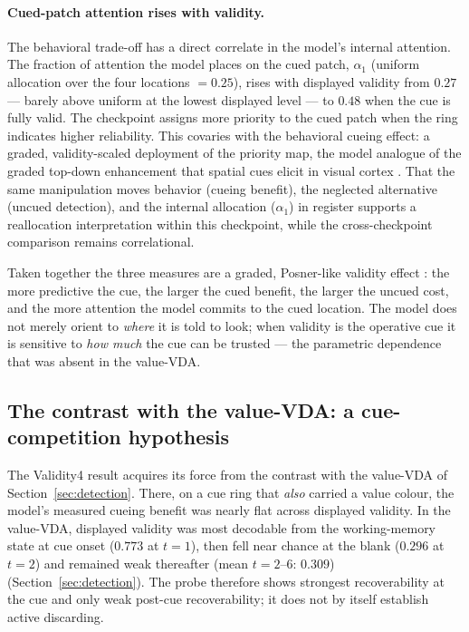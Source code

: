 \paragraph{Cued-patch attention rises with validity.} The behavioral trade-off has
a direct correlate in the model's internal attention. The fraction of attention the
model places on the cued patch, $\alpha_1$ (uniform allocation over the four
locations $= 0.25$), rises with displayed validity from $0.27$ --- barely above uniform at
the lowest displayed level --- to $0.48$ when the cue is fully valid. The checkpoint assigns more priority to the cued patch when the ring indicates higher
reliability. This covaries with the behavioral cueing effect: a
graded, validity-scaled deployment of the priority map, the model analogue of the
graded top-down enhancement that spatial cues elicit in visual cortex
\cite{mcadams_maunsell1999_v4_tuning, reynolds_heeger2009_normalization,
carrasco2011_visual_attention_25y}. That the same manipulation moves behavior
(cueing benefit), the neglected alternative (uncued detection), and the internal
allocation ($\alpha_1$) in register supports a reallocation interpretation within
this checkpoint, while the cross-checkpoint comparison remains correlational.

Taken together the three measures are a graded, Posner-like validity effect
\cite{posner1980_orienting}: the more predictive the cue, the larger the cued
benefit, the larger the uncued cost, and the more attention the model commits to the
cued location. The model does not merely orient to \emph{where} it is told to look;
when validity is the operative cue it is sensitive to \emph{how much} the cue can be
trusted --- the parametric dependence that was absent in the value-VDA.

\subsection{The contrast with the value-VDA: a cue-competition hypothesis}
\label{sec:value-crowdout}

The Validity4 result acquires its force from the contrast with the value-VDA of
Section~\ref{sec:detection}. There, on a cue ring that \emph{also} carried a value
colour, the model's measured cueing benefit was nearly flat across displayed
validity. In the value-VDA, displayed validity was most decodable from the working-memory
state at cue onset ($0.773$ at $t=1$), then fell near chance at the blank
($0.296$ at $t=2$) and remained weak thereafter (mean $t=2$--$6$: $0.309$)
(Section~\ref{sec:detection}). The probe therefore shows strongest recoverability at
the cue and only weak post-cue recoverability; it does not by itself establish active
discarding.

